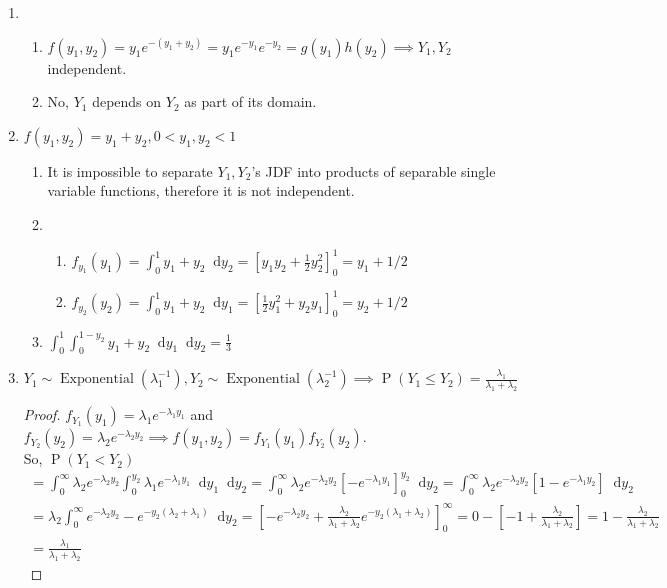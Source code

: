 \documentclass{article}
\newcommand{\pr}[1]{\operatorname{P}\left(#1\right)}
\newcommand{\expdist}[2]{#1 \sim \operatorname{Exponential}(#2)}
\newcommand*\diff{\mathop{}\!\mathrm{d}}
\newcommand{\intv}[4]{\int_{#3}^{#4} #1 \diff #2}
\begin{document}
\begin{enumerate}
  \item \begin{enumerate}
    \item $f(y_1, y_2) = y_1e^{-(y_1+y_2)} = y_1e^{-y_1}e^{-y_2} = g(y_1)h(y_2) 
    \implies Y_1, Y_2$ independent.
  
    \item No, $Y_1$ depends on $Y_2$ as part of its domain.
  \end{enumerate}

  \item $f(y_1, y_2) = y_1 + y_2, 0 < y_1, y_2 < 1$ 
  \begin{enumerate}
    \item It is impossible to separate $Y_1, Y_2$'s JDF
    into products of separable single variable functions, therefore it is not independent.
    \item \begin{enumerate}
      \item $f_{y_1}(y_1) = \intv{y_1 +y_2}{y_2}{0}{1} = 
      \left[ y_1y_2 + \frac{1}{2}y_2^2 \right]_{0}^{1} = y_1 + 1/2$
      \item $f_{y_2}(y_2) = \intv{y_1 +y_2}{y_1}{0}{1} = 
      \left[ \frac{1}{2}y_1^2 + y_2y_1  \right]_{0}^{1} = y_2 + 1/2$
    \end{enumerate}

    \item $\intv{ \intv{y_1+y_2}{y_1}{0}{1-y_2} }{y_2}{0}{1} = \frac{1}{3}$
  \end{enumerate}

  \item $\expdist{Y_1}{\lambda_1^{-1}}, \expdist{Y_2}{\lambda_2^{-1}} 
  \implies \pr{Y_1 \leq Y_2} = \frac{\lambda_1}{\lambda_1 + \lambda_2}$
  \begin{proof}
    $f_{Y_1}(y_1) = \lambda_1e^{-\lambda_1y_1}$
    and $f_{Y_2}(y_2) = \lambda_2e^{-\lambda_2y_2} \implies
    f(y_1, y_2) = f_{Y_1}(y_1)f_{Y_2}(y_2)$.\\
    So, $\pr{Y_1 < Y_2}$ \begin{align*}
      = \intv{
        \lambda_2e^{-\lambda_2y_2}
        \intv{ \lambda_1e^{-\lambda_1y_1} }{y_1}{0}{y_2}
      }{y_2}{0}{\infty}
      = \intv{
        \lambda_2e^{-\lambda_2y_2}
        \left[ -e^{-\lambda_1y_1} \right]_{0}^{y_2}
      }{y_2}{0}{\infty}
      = \intv{
        \lambda_2e^{-\lambda_2y_2}
        \left[ 1-e^{-\lambda_1y_2} \right]
      }{y_2}{0}{\infty}\\
      = \lambda_2\intv{
        e^{-\lambda_2y_2}-e^{-y_2(\lambda_2+\lambda_1)}
      }{y_2}{0}{\infty}
      = \left[
        -e^{-\lambda_2y_2} + \frac{\lambda_2}{\lambda_1 + \lambda_2}e^{-y_2(\lambda_1+\lambda_2)}
      \right]_{0}^{\infty}
      = 0 - \left[ -1 + \frac{\lambda_2}{\lambda_1 + \lambda_2} \right]
      = 1 - \frac{\lambda_2}{\lambda_1 + \lambda_2}\\
      = \frac{\lambda_1}{\lambda_1 + \lambda_2}
    \end{align*}
  \end{proof}
\end{enumerate}
\end{document}
